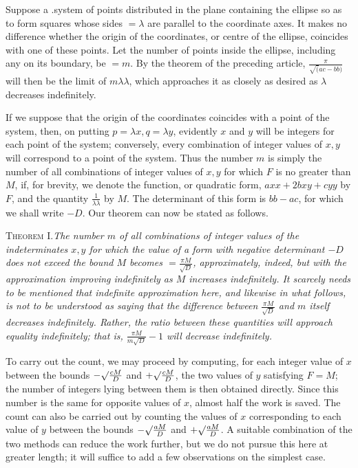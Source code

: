 Suppose a .system of points distributed in the plane containing the ellipse so as to form squares whose sides $=\lambda$ are parallel to the coordinate axes. It makes no difference whether the origin of the coordinates, or centre of the ellipse, coincides with one of these points. Let the number of points inside the ellipse, including any on its boundary, be $=m$. By the theorem of the preceding article, $\frac\pi{\surd(ac-bb)}$ will then be the limit of $m\lambda\lambda$, which approaches it as closely as desired as $\lambda$ decreases indefinitely.

If we suppose that the origin of the coordinates coincides with a point of the system, then, on putting $p=\lambda x,q=\lambda y$, evidently $x$ and $y$ will be integers for each point of the system; conversely, every combination of integer values of
$x,y$ will correspond to a point of the system. Thus the number $m$ is simply the number of all combinations of integer values of $x,y$ for which $F$ is no greater than $M$, if, for brevity, we denote the function, or quadratic form, $axx+2bxy+cyy$ by $F$, and the quantity $\frac1{\lambda\lambda}$ by $M$. The determinant of this form is $bb-ac$, for which we shall write $-D$. Our theorem can now be stated as follows.

\textsc{Theorem I.}\quad\emph{The number $m$ of all combinations of integer values of the indeterminates $x,y$ for which the value of a form with negative determinant $-D$ does not exceed the bound $M$ becomes $=\frac{\pi M}{\surd D}$, approximately, indeed, but with the approximation improving indefinitely as $M$ increases indefinitely. It scarcely needs to be mentioned that indefinite approximation here, and likewise in what follows, is not to be understood as saying that the difference between $\frac{\pi M}{\surd D}$ and $m$ itself decreases indefinitely. Rather, the ratio between these quantities will approach equality indefinitely; that is, $\frac{\pi M}{m\surd D}-1$ will decrease indefinitely.}

To carry out the count, we may proceed by computing, for each integer value of $x$ between the bounds $-\surd\frac{cM}D$ and $+\surd\frac{cM}D$, the two values of $y$ satisfying $F=M$; the number of integers lying between them is then obtained directly. Since this number is the same for opposite values of $x$, almost half the work is saved. The count can also be carried out by counting the values of $x$ corresponding to each value of $y$ between the bounds $-\surd\frac{aM}D$ and $+\surd\frac{aM}D$. A suitable combination of the two methods can reduce the work further, but we do not pursue this here at greater length; it will suffice to add a few observations on the simplest case.

